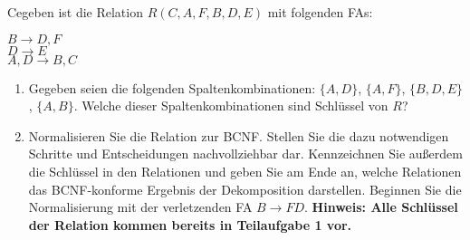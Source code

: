  Cegeben ist die Relation $R(C,A,F,B,D,E)$ mit folgenden FAs:

 $B \rightarrow D,F$\\
 $D \rightarrow E$\\
 $A,D \rightarrow B,C$

 \begin{enumerate}
 	\item Gegeben seien die folgenden Spaltenkombinationen: $\{A,D\}$, $\{A,F\}$, $\{B,D,E\}$, $\{A,B\}$. Welche dieser Spaltenkombinationen sind Schlüssel von $R$?



 \item Normalisieren Sie die Relation zur BCNF. Stellen Sie die dazu notwendigen Schritte und Entscheidungen nachvollziehbar dar. Kennzeichnen Sie außerdem die Schlüssel in den Relationen und geben Sie am Ende an, welche Relationen das BCNF-konforme Ergebnis der Dekomposition darstellen.
 Beginnen Sie die Normalisierung mit der verletzenden FA $B \rightarrow FD$. \textbf{Hinweis: Alle Schlüssel der Relation kommen bereits in Teilaufgabe 1 vor.}

\end{enumerate}
